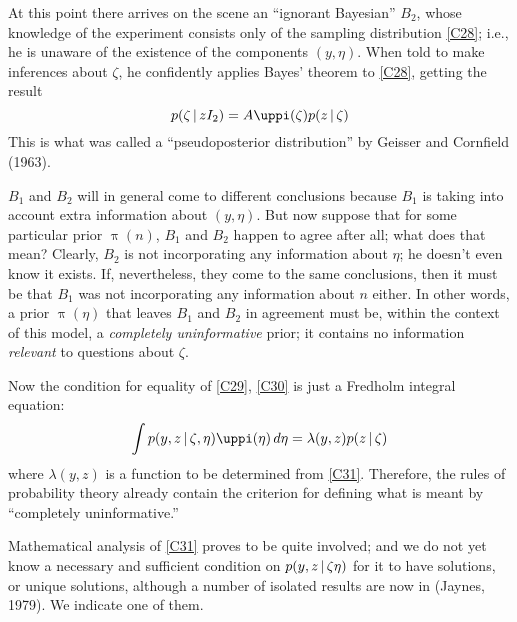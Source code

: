 {At this point there arrives on the scene an ``ignorant Bayesian'' $B_2$, whose knowledge of the experiment consists only of the sampling distribution \eqref{C28}; i.e., he is unaware of the existence of the components $(y, \eta)$.
When told to make inferences about $\zeta$, he confidently applies Bayes' theorem to \eqref{C28}, getting the result
\begin{equation}
	\label{C30}
	p(\zeta \given z I_2) = A \uppi(\zeta) p(z \given \zeta)
\end{equation}
This is what was called a ``pseudoposterior distribution'' by Geisser and Cornfield (1963).

$B_1$ and $B_2$ will in general come to different conclusions because $B_1$ is taking into account extra information about $(y, \eta)$.
But now suppose that for some particular prior $\uppi(n)$, $B_1$ and $B_2$ happen to agree after all; what does that mean?
Clearly, $B_2$ is not incorporating any information about $\eta$; he doesn't even know it exists.
If, nevertheless, they come to the same conclusions, then it must be that $B_1$ was not incorporating any information about $n$ either.
In other words, a prior $\uppi(\eta)$ that leaves $B_1$ and $B_2$ in agreement must be, within the context of this model, a \emph{completely uninformative} prior; it contains no information \emph{relevant} to questions about $\zeta$.

Now the condition for equality of \eqref{C29}, \eqref{C30} is just a Fredholm integral equation:
\begin{equation}
	\label{C31}
	\int p(y, z \given \zeta, \eta) \uppi(\eta) \dd \eta = \lambda(y, z) p(z \given \zeta)
\end{equation}
where $\lambda(y, z)$ is a function to be determined from \eqref{C31}.
Therefore, the rules of probability theory already contain the criterion for defining what is meant by ``completely uninformative.''

Mathematical analysis of \eqref{C31} proves to be quite involved; and we do not yet know a necessary and sufficient condition on $p(y, z \,\vert\, \zeta \eta)$ for it to have solutions, or unique solutions, although a number of isolated results are now in (Jaynes, \cite{jaynes79}{1979}).
We indicate one of them.

}
